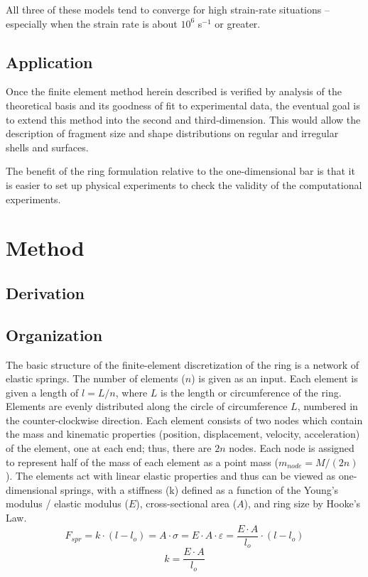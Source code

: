 \documentclass[12pt,a4paper]{article}
\begin{document}
All three of these models tend to converge for high strain-rate situations -- especially when the strain rate is about $10^{6}$ s$^{-1}$ or greater.

\subsection{Application}

Once the finite element method herein described is verified by analysis of the theoretical basis and its goodness of fit to experimental data, the eventual goal is to extend this method into the second and third-dimension. This would allow the description of fragment size and shape distributions on regular and irregular shells and surfaces.

The benefit of the ring formulation relative to the one-dimensional bar is that it is easier to set up physical experiments to check the validity of the computational experiments.

\section{Method}

\subsection{Derivation}

\subsection{Organization}

The basic structure of the finite-element discretization of the ring is a network of elastic springs.  The number of elements ($n$) is given as an input. Each element is given a length of $l = L/n$, where $L$ is the length or circumference of the ring. Elements are evenly distributed along the circle of circumference $L$, numbered in the counter-clockwise direction. Each element consists of two nodes which contain the mass and kinematic properties (position, displacement, velocity, acceleration) of the element, one at each end; thus, there are $2n$ nodes. Each node is assigned to represent half of the mass of each element as a point mass ($m_{node} = M / (2n)$). The elements act with linear elastic properties and thus can be viewed as one-dimensional springs, with a stiffness (k) defined as a function of the Young's modulus / elastic modulus ($E$), cross-sectional area ($A$), and ring size by Hooke's Law.
\begin{equation}
F_{spr} = k \cdot (l-l_{o}) = A \cdot \sigma = E \cdot A \cdot \varepsilon = \frac{E \cdot A}{l_{o}} \cdot (l-l_{o})
\label{eq:sprForce}
\end{equation}
\begin{equation}
k = \frac{E \cdot A}{l_{o}}
\label{eq:sprStiff}
\end{equation}
\end{document}
